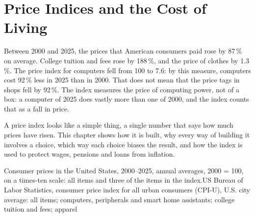 \chapter{Price Indices and the Cost of Living}\label{ch:g10:price-indices}

Between 2000 and 2025, the prices that American consumers paid rose by 87\,\% on average. College tuition and fees rose by 188\,\%, and the price
of clothes by 1.3\,\%. The price index for computers fell from 100 to 7.6: by this measure, computers cost 92\,\% less in 2025 than in 2000. That does not mean that
the price tags in shops fell by 92\,\%. The index measures the price of computing power, not of a box: a computer of
2025 does vastly more than one of 2000, and the index counts that as a fall in price.

A price index looks like a simple thing, a single number that says how much prices have risen. This chapter shows how it is built, why every way of
building it involves a choice, which way each choice biases the result, and how the index is used to protect wages, pensions and loans from inflation.

\begin{openingchart}{Consumer prices in the United States, 2000--2025, annual averages, 2000 = 100, on a times-ten scale: all items and three of the
items in the index.}{US Bureau of Labor Statistics, consumer price index for all urban consumers (CPI-U), U.S. city average: all items; computers,
peripherals and smart home assistants; college tuition and fees; apparel}
\end{openingchart}

